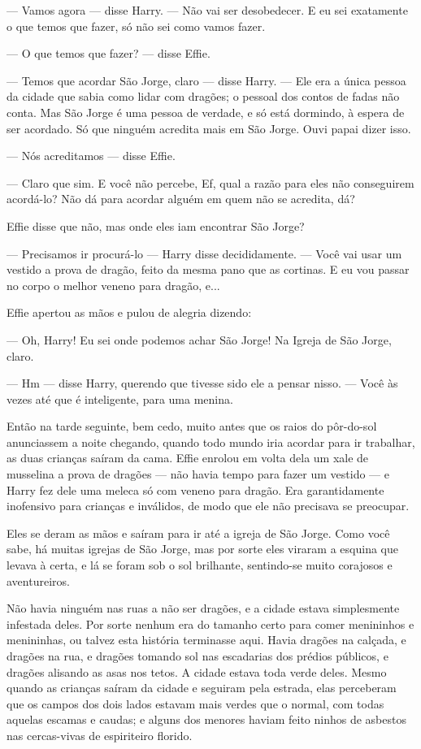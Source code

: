 — Vamos agora — disse Harry. — Não vai ser desobedecer. E eu sei
exatamente o que temos que fazer, só não sei como vamos fazer.

— O que temos que fazer? — disse Effie.

— Temos que acordar São Jorge, claro — disse Harry. — Ele era a única
pessoa da cidade que sabia como lidar com dragões; o pessoal dos
contos de fadas não conta. Mas São Jorge é uma pessoa de verdade, e
só está dormindo, à espera de ser acordado. Só que ninguém acredita
mais em São Jorge. Ouvi papai dizer isso.

— Nós acreditamos — disse Effie.

— Claro que sim. E você não percebe, Ef, qual a razão para eles não
conseguirem acordá-lo? Não dá para acordar alguém em quem não se
acredita, dá?

Effie disse que não, mas onde eles iam encontrar São Jorge?

— Precisamos ir procurá-lo — Harry disse decididamente. — Você vai
usar um vestido a prova de dragão, feito da mesma pano que as
cortinas. E eu vou passar no corpo o melhor veneno para dragão, e...

Effie apertou as mãos e pulou de alegria dizendo:

— Oh, Harry! Eu sei onde podemos achar São Jorge! Na Igreja de São
Jorge, claro.

— Hm — disse Harry, querendo que tivesse sido ele a pensar nisso. —
Você às vezes até que é inteligente, para uma menina.

Então na tarde seguinte, bem cedo, muito antes que os raios do
pôr-do-sol anunciassem a noite chegando, quando todo mundo iria
acordar para ir trabalhar, as duas crianças saíram da cama. Effie
enrolou em volta dela um xale de musselina a prova de dragões — não
havia tempo para fazer um vestido — e Harry fez dele uma meleca só
com veneno para dragão. Era garantidamente inofensivo para crianças e
inválidos, de modo que ele não precisava se preocupar.

Eles se deram as mãos e saíram para ir até a igreja de São Jorge. Como
você sabe, há muitas igrejas de São Jorge, mas por sorte eles viraram
a esquina que levava à certa, e lá se foram sob o sol brilhante,
sentindo-se muito corajosos e aventureiros.

Não havia ninguém nas ruas a não ser dragões, e a cidade estava
simplesmente infestada deles. Por sorte nenhum era do tamanho certo
para comer menininhos e menininhas, ou talvez esta história
terminasse aqui. Havia dragões na calçada, e dragões na rua, e
dragões tomando sol nas escadarias dos prédios públicos, e dragões
alisando as asas nos tetos. A cidade estava toda verde deles. Mesmo
quando as crianças saíram da cidade e seguiram pela estrada, elas
perceberam que os campos dos dois lados estavam mais verdes que o
normal, com todas aquelas escamas e caudas; e alguns dos menores
haviam feito ninhos de asbestos nas cercas-vivas de espiriteiro
florido.

